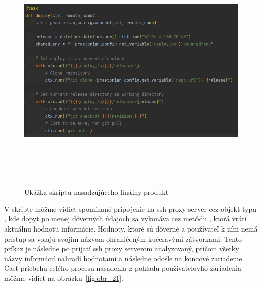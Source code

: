 \begin{figure}[H]
\begin{center}\includegraphics[width=\textwidth,height=12cm,keepaspectratio=true]{assets/deploy_script.png}\end{center}
\caption[Ukážka skriptu nasadzujúceho finálny produkt]{Ukážka skriptu nasadzujúceho finálny produkt}\label{fig:obr_20}
\end{figure}

V skripte môžme vidieť spomínané pripojenie na ssh proxy server cez objekt typu , kde dopyt
po menej dôverných údajoch sa vykonáva cez metódu , ktorá vráti aktuálnu hodnotu informácie.
Hodnoty, ktoré sú dôverné a používateľ k ním nemá prístup sa volajú svojim názvom ohraničeným kučeravými zátvorkami.
Tento príkaz je následne po prijatí ssh proxy serverom analyzovaný, pričom všetky názvy informácií nahradí hodnotami a následne
odošle na koncové zariadenie. Časť priebehu celého procesu nasadenia z pohľadu používateľovho zariadenia môžme vidieť na
obrázku~\ref{fig:obr_21}.

